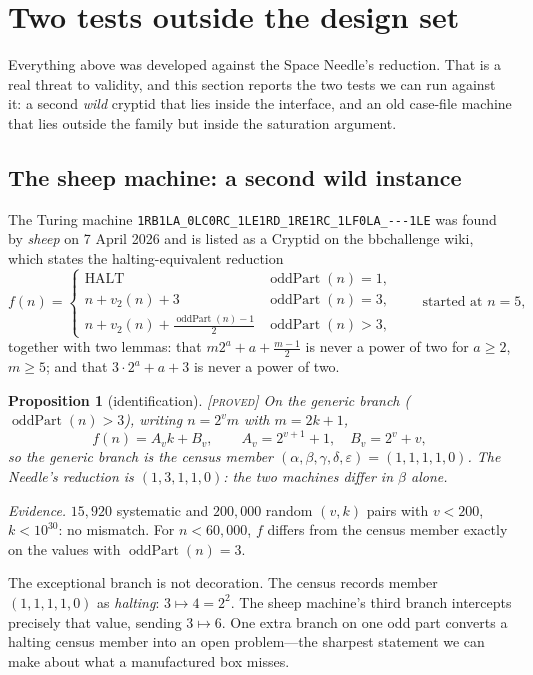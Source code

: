 \documentclass[11pt]{article}
\newtheorem{proposition}[theorem]{Proposition}
\theoremstyle{definition}
\theoremstyle{remark}
\newcommand{\oddpart}{\operatorname{oddPart}}
\newcommand{\vp}[1]{v_{#1}}
\newcommand{\Proved}{\textsc{[proved]}}
\begin{document}
\section{Two tests outside the design set}
\label{sec:wild}

Everything above was developed against the Space Needle's reduction.  That is
a real threat to validity, and this section reports the two tests we can run
against it: a second \emph{wild} cryptid that lies inside the interface, and
an old case-file machine that lies outside the family but inside the
saturation argument.

\subsection{The sheep machine: a second wild instance}
\label{sec:sheep}

The Turing machine \verb|1RB1LA_0LC0RC_1LE1RD_1RE1RC_1LF0LA_---1LE| was found
by \emph{sheep} on 7 April 2026 and is listed as a Cryptid on the bbchallenge
wiki, which states the halting-equivalent reduction
\[
f(n)=\begin{cases}
\text{HALT} & \oddpart(n)=1,\\
n+\vp{2}(n)+3 & \oddpart(n)=3,\\
n+\vp{2}(n)+\tfrac{\oddpart(n)-1}{2} & \oddpart(n)>3,
\end{cases}
\qquad\text{started at } n=5,
\]
together with two lemmas: that $m2^a+a+\frac{m-1}{2}$ is never a power of two
for $a\ge2$, $m\ge5$; and that $3\cdot2^a+a+3$ is never a power of two.

\begin{proposition}[identification]\label{prop:sheep-id}
\Proved\; On the generic branch ($\oddpart(n)>3$), writing $n=2^v m$ with
$m=2k+1$,
\[
f(n)=A_vk+B_v,\qquad A_v=2^{v+1}+1,\quad B_v=2^v+v,
\]
so the generic branch is the census member $(\alpha,\beta,\gamma,\delta,
\varepsilon)=(1,1,1,1,0)$.  The Needle's reduction is $(1,3,1,1,0)$: the two
machines differ in $\beta$ alone.
\end{proposition}

\emph{Evidence.}  $15{,}920$ systematic and $200{,}000$ random $(v,k)$ pairs
with $v<200$, $k<10^{30}$: no mismatch.  For $n<60{,}000$, $f$ differs from
the census member exactly on the values with $\oddpart(n)=3$.

The exceptional branch is not decoration.  The census records member
$(1,1,1,1,0)$ as \emph{halting}: $3\mapsto4=2^2$.  The sheep machine's third
branch intercepts precisely that value, sending $3\mapsto6$.  One extra branch
on one odd part converts a halting census member into an open problem---the
sharpest statement we can make about what a manufactured box misses.
\end{document}
